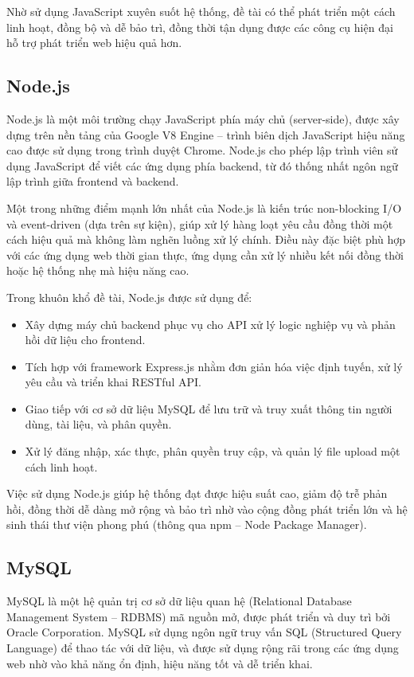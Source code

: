 \documentclass{article}
\begin{document}
	Nhờ sử dụng JavaScript xuyên suốt hệ thống, đề tài có thể phát triển một cách linh hoạt, đồng bộ và dễ bảo trì, đồng thời tận dụng được các công cụ hiện đại hỗ trợ phát triển web hiệu quả hơn.
	
	\subsection{Node.js}
	
	Node.js là một môi trường chạy JavaScript phía máy chủ (server-side), được xây dựng trên nền tảng của Google V8 Engine – trình biên dịch JavaScript hiệu năng cao được sử dụng trong trình duyệt Chrome. Node.js cho phép lập trình viên sử dụng JavaScript để viết các ứng dụng phía backend, từ đó thống nhất ngôn ngữ lập trình giữa frontend và backend.
	
	Một trong những điểm mạnh lớn nhất của Node.js là kiến trúc non-blocking I/O và event-driven (dựa trên sự kiện), giúp xử lý hàng loạt yêu cầu đồng thời một cách hiệu quả mà không làm nghẽn luồng xử lý chính. Điều này đặc biệt phù hợp với các ứng dụng web thời gian thực, ứng dụng cần xử lý nhiều kết nối đồng thời hoặc hệ thống nhẹ mà hiệu năng cao.
	
	Trong khuôn khổ đề tài, Node.js được sử dụng để:
	\begin{itemize}
		\item Xây dựng máy chủ backend phục vụ cho API xử lý logic nghiệp vụ và phản hồi dữ liệu cho frontend.
		\item Tích hợp với framework Express.js nhằm đơn giản hóa việc định tuyến, xử lý yêu cầu và triển khai RESTful API.
		\item Giao tiếp với cơ sở dữ liệu MySQL để lưu trữ và truy xuất thông tin người dùng, tài liệu, và phân quyền.
		\item Xử lý đăng nhập, xác thực, phân quyền truy cập, và quản lý file upload một cách linh hoạt.
	\end{itemize}
	
	Việc sử dụng Node.js giúp hệ thống đạt được hiệu suất cao, giảm độ trễ phản hồi, đồng thời dễ dàng mở rộng và bảo trì nhờ vào cộng đồng phát triển lớn và hệ sinh thái thư viện phong phú (thông qua npm – Node Package Manager).
	
	\subsection{MySQL}
	
	MySQL là một hệ quản trị cơ sở dữ liệu quan hệ (Relational Database Management System – RDBMS) mã nguồn mở, được phát triển và duy trì bởi Oracle Corporation. MySQL sử dụng ngôn ngữ truy vấn SQL (Structured Query Language) để thao tác với dữ liệu, và được sử dụng rộng rãi trong các ứng dụng web nhờ vào khả năng ổn định, hiệu năng tốt và dễ triển khai.
	
\end{document}

